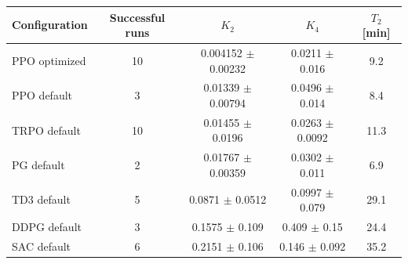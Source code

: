 \begin{tabular}{lcccc}
\toprule
Configuration & Successful runs & $K_2$ & $K_4$ & $T_2$ [min] \\
\midrule
PPO optimized & 10 & 0.004152 $\pm$ 0.00232 & 0.0211 $\pm$ 0.016 & 9.2 \\
PPO default & 3 & 0.01339 $\pm$ 0.00794 & 0.0496 $\pm$ 0.014 & 8.4 \\
TRPO default & 10 & 0.01455 $\pm$ 0.0196 & 0.0263 $\pm$ 0.0092 & 11.3 \\
PG default & 2 & 0.01767 $\pm$ 0.00359 & 0.0302 $\pm$ 0.011 & 6.9 \\
TD3 default & 5 & 0.0871 $\pm$ 0.0512 & 0.0997 $\pm$ 0.079 & 29.1 \\
DDPG default & 3 & 0.1575 $\pm$ 0.109 & 0.409 $\pm$ 0.15 & 24.4 \\
SAC default & 6 & 0.2151 $\pm$ 0.106 & 0.146 $\pm$ 0.092 & 35.2 \\
\bottomrule
\end{tabular}

